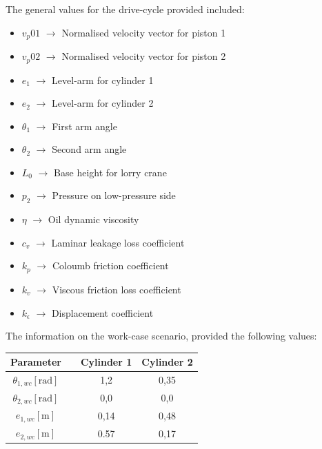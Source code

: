 \documentclass[12pt]{article}
\begin{document}
            The general values for the drive-cycle provided included:\\
            \begin{itemize}
                \item $v_p01$ $\rightarrow$ Normalised velocity vector for piston 1
                \item $v_p02$ $\rightarrow$ Normalised velocity vector for piston 2
                \item $e_1$ $\rightarrow$ Level-arm for cylinder 1
                \item $e_2$ $\rightarrow$ Level-arm for cylinder 2
                \item $\theta_1$ $\rightarrow$ First arm angle
                \item $\theta_2$ $\rightarrow$ Second arm angle
                \item $L_0$ $\rightarrow$ Base height for lorry crane
                \item $p_2$ $\rightarrow$ Pressure on low-pressure side
                \item $\eta$ $\rightarrow$ Oil dynamic viscosity
                \item $c_v$ $\rightarrow$ Laminar leakage loss coefficient
                \item $k_p$ $\rightarrow$ Coloumb friction coefficient
                \item $k_v$ $\rightarrow$ Viscous friction loss coefficient
                \item $k_{\epsilon}$ $\rightarrow$ Displacement coefficient
            \end{itemize}
            The information on the work-case scenario, provided the following values:
            \begin{center}
                \begin{tabular}{cccc}
                    \hline
                    Parameter & & Cylinder 1 & Cylinder 2\\
                    \hline
                    $\theta_{1,wc} [\text{rad}]$ & & 1,2 & 0,35\\
                    $\theta_{2,wc} [\text{rad}]$ & & 0,0  & 0,0\\
                    $e_{1,wc} [\text{m}]$ & & 0,14 & 0,48\\
                    $e_{2,wc} [\text{m}]$ & & 0.57 & 0,17\\
                    \hline
                \end{tabular}
            \end{center}
         
\end{document}
